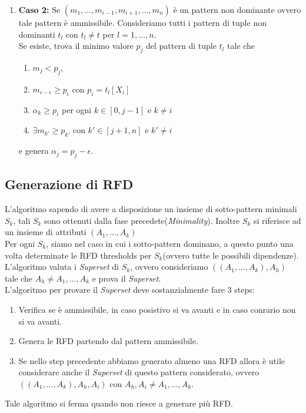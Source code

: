 \begin{itemize}
\begin{enumerate}
				\item  \textbf{Caso 2:} Se $(m_{1},\dots,m_{i-1},m_{i+1},\dots,m_{n})$ è un pattern non dominante ovvero tale pattern è ammissibile.
				Consideriamo tutti i pattern di tuple non dominanti $t_{l}$ con $t_{l}\neq t$ per $l=1,\dots,n$.\\
				Se esiste, trova il minimo valore $p_{j}$ del pattern di tuple $t_{l}$ tale che
				\begin{enumerate}
					\item  $m_{j}<p_{j}$, 
					\item $m_{i-\epsilon} \geq p_{i}$ con $p_{i}=t_{l}[X_{i}]$
					\item $\alpha_{k} \geq p_{i}$ per ogni $k \in [0,j-1]$ e $k \neq i$
					\item $\exists m_{k'} \geq p_{k'}$ con $k' \in [j+1,n]$ e $k' \neq i$
				\end{enumerate}  
				e genera $\alpha_{j}= p_{j} -\epsilon$.\\ 
			\end{enumerate}  		
\end{itemize}

\subsection{Generazione di RFD}
L'algoritmo sapendo di avere a disposizione un insieme di sotto-pattern minimali $S_{k}$, tali $S_{k}$ sono ottenuti dalla fase precedete(\textit{Minimality}). Inoltre $S_{k}$ si riferisce ad un insieme di attributi $(A_{1},\dots,A_{k})$ \\
Per ogni $S_{k}$, siamo nel caso in cui i sotto-pattern dominano, a questo punto una volta determinate le RFD thresholds per $S_{k}$(ovvero tutte le possibili dipendenze). L'algoritmo valuta i \textit{Superset} di $S_{k}$, ovvero consideriamo $((A_{1},\dots,A_{k}),A_{h})$ tale che $A_{h} \neq A_{1},\dots,A_{k}$ e prova il \textit{Superset}.\\ 
L'algoritmo per provare il \textit{Superset} deve sostanzialmente fare 3 steps:
\begin{enumerate}
	\item Verifica se è ammissibile, in caso posistivo si va avanti e in caso conrario non si va avanti.
	\item Genera le RFD partendo dal pattern ammissibile. 
	\item Se nello step precedente abbiamo generato almeno una RFD  allora è utile considerare anche il \textit{Superset} di questo pattern considerato, ovvero $((A_{1},\dots,A_{k}),A_{h},A_{i})$ con $A_{h},A_{i} \neq A_{1},\dots,A_{k}$.
\end{enumerate}
Tale algoritmo si ferma quando non riesce a generare più RFD. 

